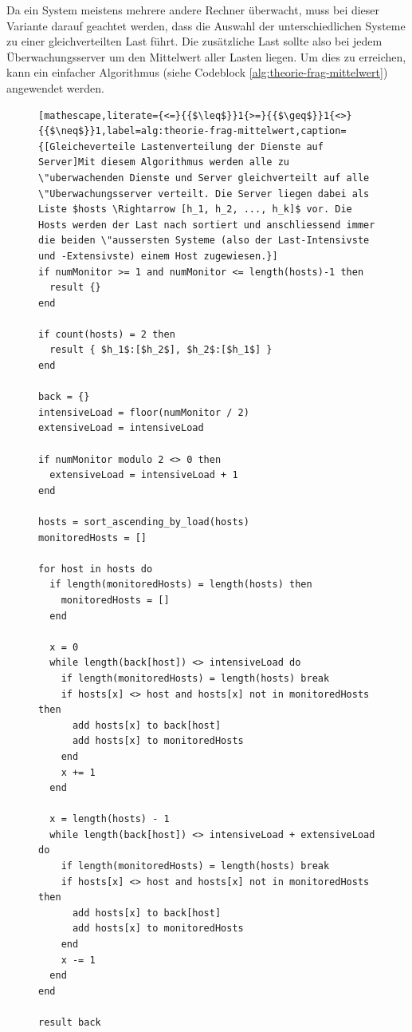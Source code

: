 Da ein System meistens mehrere andere Rechner \"uberwacht, muss bei dieser Variante darauf geachtet werden, dass die Auswahl der unterschiedlichen Systeme zu einer gleichverteilten Last f\"uhrt. Die zus\"atzliche Last sollte also bei jedem \"Uberwachungsserver um den Mittelwert aller Lasten liegen. Um dies zu erreichen, kann ein einfacher Algorithmus (siehe Codeblock \ref{alg:theorie-frag-mittelwert}) angewendet werden.
\begin{figure}[H]
 \lstset{language=Pascal}
 \begin{lstlisting}[mathescape,literate={<=}{{$\leq$}}1{>=}{{$\geq$}}1{<>}{{$\neq$}}1,label=alg:theorie-frag-mittelwert,caption={[Gleicheverteile Lastenverteilung der Dienste auf Server]Mit diesem Algorithmus werden alle zu \"uberwachenden Dienste und Server gleichverteilt auf alle \"Uberwachungsserver verteilt. Die Server liegen dabei als Liste $hosts \Rightarrow [h_1, h_2, ..., h_k]$ vor. Die Hosts werden der Last nach sortiert und anschliessend immer die beiden \"aussersten Systeme (also der Last-Intensivste und -Extensivste) einem Host zugewiesen.}]
if numMonitor >= 1 and numMonitor <= length(hosts)-1 then
  result {}
end

if count(hosts) = 2 then
  result { $h_1$:[$h_2$], $h_2$:[$h_1$] }
end

back = {}
intensiveLoad = floor(numMonitor / 2)
extensiveLoad = intensiveLoad

if numMonitor modulo 2 <> 0 then
  extensiveLoad = intensiveLoad + 1
end

hosts = sort_ascending_by_load(hosts)
monitoredHosts = []

for host in hosts do
  if length(monitoredHosts) = length(hosts) then
    monitoredHosts = []
  end

  x = 0
  while length(back[host]) <> intensiveLoad do
    if length(monitoredHosts) = length(hosts) break
    if hosts[x] <> host and hosts[x] not in monitoredHosts then
      add hosts[x] to back[host]
      add hosts[x] to monitoredHosts
    end
    x += 1
  end

  x = length(hosts) - 1
  while length(back[host]) <> intensiveLoad + extensiveLoad do
    if length(monitoredHosts) = length(hosts) break
    if hosts[x] <> host and hosts[x] not in monitoredHosts then
      add hosts[x] to back[host]
      add hosts[x] to monitoredHosts
    end
    x -= 1
  end
end

result back
 \end{lstlisting}
\end{figure}


